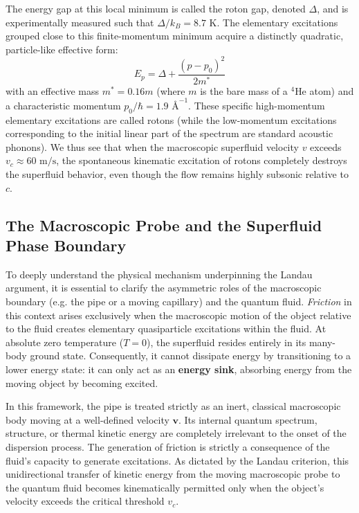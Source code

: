 \begin{example}[Helium-4]
    The energy gap at this local minimum is called the roton gap, denoted \( \Delta \), and is experimentally measured such that \( \Delta/k_B = 8.7 \text{ K} \). The elementary excitations grouped close to this finite-momentum minimum acquire a distinctly quadratic, particle-like effective form:
    \[
        E_p = \Delta + \frac{(p - p_0)^2}{2m^*}
    \]
    with an effective mass \( m^* = 0.16m \) (where \( m \) is the bare mass of a \( ^4\text{He} \) atom) and a characteristic momentum \( p_0/\hbar = 1.9 \text{ \AA}^{-1} \). These specific high-momentum elementary excitations are called rotons (while the low-momentum excitations corresponding to the initial linear part of the spectrum are standard acoustic phonons). We thus see that when the macroscopic superfluid velocity \( v \) exceeds \( v_c \approx 60 \text{ m/s} \), the spontaneous kinematic excitation of rotons completely destroys the superfluid behavior, even though the flow remains highly subsonic relative to \( c \).
\end{example}

\subsection{The Macroscopic Probe and the Superfluid Phase Boundary}

To deeply understand the physical mechanism underpinning the Landau argument, it is essential to clarify the asymmetric roles of the macroscopic boundary (e.g. the pipe or a moving capillary) and the quantum fluid. \textit{Friction} in this context arises exclusively when the macroscopic motion of the object relative to the fluid creates elementary quasiparticle excitations within the fluid. At absolute zero temperature (\( T = 0 \)), the superfluid resides entirely in its many-body ground state. Consequently, it cannot dissipate energy by transitioning to a lower energy state: it can only act as an \textbf{energy sink}, absorbing energy from the moving object by becoming excited.

In this framework, the pipe is treated strictly as an inert, classical macroscopic body moving at a well-defined velocity \( \mathbf{v} \). Its internal quantum spectrum, structure, or thermal kinetic energy are completely irrelevant to the onset of the dispersion process. The generation of friction is strictly a consequence of the fluid's capacity to generate excitations. As dictated by the Landau criterion, this unidirectional transfer of kinetic energy from the moving macroscopic probe to the quantum fluid becomes kinematically permitted only when the object's velocity exceeds the critical threshold \( v_c \).

